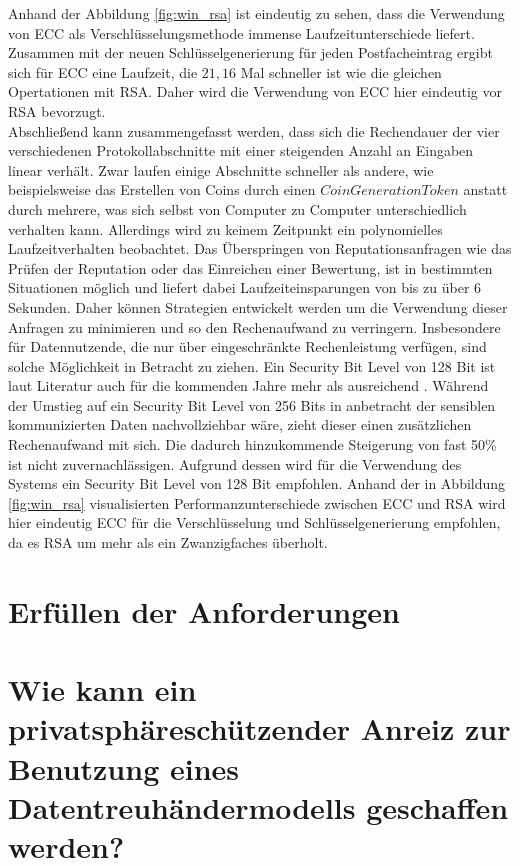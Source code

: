 \documentclass{scrreprt}
\begin{document}
Anhand der Abbildung \ref{fig:win_rsa} ist eindeutig zu sehen, dass die Verwendung von ECC als Verschlüsselungsmethode immense Laufzeitunterschiede liefert. Zusammen mit der neuen Schlüsselgenerierung für jeden Postfacheintrag ergibt sich für ECC eine Laufzeit, die $21,16$ Mal schneller ist wie die gleichen Opertationen mit RSA. Daher wird die Verwendung von ECC hier eindeutig vor RSA bevorzugt.\\

Abschließend kann zusammengefasst werden, dass sich die Rechendauer der vier verschiedenen Protokollabschnitte mit einer steigenden Anzahl an Eingaben linear verhält. Zwar laufen einige Abschnitte schneller als andere, wie beispielsweise das Erstellen von Coins durch einen $CoinGenerationToken$ anstatt durch mehrere, was sich selbst von Computer zu Computer unterschiedlich verhalten kann. Allerdings wird zu keinem Zeitpunkt ein polynomielles Laufzeitverhalten beobachtet. Das Überspringen von Reputationsanfragen wie das Prüfen der Reputation oder das Einreichen einer Bewertung, ist in bestimmten Situationen möglich und liefert dabei Laufzeiteinsparungen von bis zu über 6 Sekunden. Daher können Strategien entwickelt werden um die Verwendung dieser Anfragen zu minimieren und so den Rechenaufwand zu verringern. Insbesondere für Datennutzende, die nur über eingeschränkte Rechenleistung verfügen, sind solche Möglichkeit in Betracht zu ziehen. Ein Security Bit Level von 128 Bit ist laut Literatur auch für die kommenden Jahre mehr als ausreichend \cite{elaine2016recommendation,bsi2020cryptographic}. Während der Umstieg auf ein Security Bit Level von 256 Bits in anbetracht der sensiblen kommunizierten Daten nachvollziehbar wäre, zieht dieser einen zusätzlichen Rechenaufwand mit sich. Die dadurch hinzukommende Steigerung von fast 50\% ist nicht zuvernachlässigen. Aufgrund dessen wird für die Verwendung des Systems ein Security Bit Level von 128 Bit empfohlen. Anhand der in Abbildung \ref{fig:win_rsa} visualisierten Performanzunterschiede zwischen ECC und RSA wird hier eindeutig ECC für die Verschlüsselung und Schlüsselgenerierung empfohlen, da es RSA um mehr als ein Zwanzigfaches überholt.

\section{Erfüllen der Anforderungen}

\section{Wie kann ein privatsphäreschützender Anreiz zur Benutzung eines Datentreuhändermodells geschaffen werden?}
\end{document}
